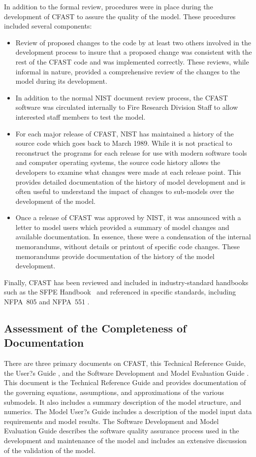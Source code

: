 In addition to the formal review, procedures were in place during the development of CFAST to assure the quality of the model.  These procedures included several components:
\begin{itemize}
\item Review of proposed changes to the code by at least two others involved in the development process to insure that a proposed change was consistent with the rest of the CFAST code and was implemented correctly. These reviews, while informal in nature, provided a comprehensive review of the changes to the model during its development.
\item In addition to the normal NIST document review process, the CFAST software was circulated internally to Fire Research Division Staff to allow interested staff members to test the model.
\item For each major release of CFAST, NIST has maintained a history of the source code which goes back to March 1989.  While it is not practical to reconstruct the programs for each release for use with modern software tools and computer operating systems, the source code history allows the developers to examine what changes were made at each release point. This provides detailed documentation of the history of model development and is often useful to understand the impact of changes to sub-models over the development of the model.
\item Once a release of CFAST was approved by NIST, it was announced with a letter to model users which provided a summary of model changes and available documentation.  In essence, these were a condensation of the internal memorandums, without details or printout of specific code changes.  These memorandums provide documentation of the history of the model development.
\end{itemize}
Finally, CFAST has been reviewed and included in industry-standard handbooks such as the SFPE Handbook~\cite{Walton:2003} and referenced in specific standards, including NFPA~805 \cite{NFPA805:2004} and NFPA~551 \cite{NFPA551:2004}.

\subsection{Assessment of the Completeness of Documentation}

There are three primary documents on CFAST, this Technical Reference Guide, the User?s Guide \cite{CFAST_Users_Guide_6}, and the Software Development and Model Evaluation Guide \cite{CFAST_Valid_Guide_6}.  This document is the Technical Reference Guide and provides documentation of the governing equations, assumptions, and approximations of the various submodels. It also includes a summary description of the model structure, and numerics.  The Model User?s Guide includes a description of the model input data requirements and model results. The Software Development and Model Evaluation Guide describes the software quality assurance process used in the development and maintenance of the model and includes an extensive discussion of the validation of the model.

